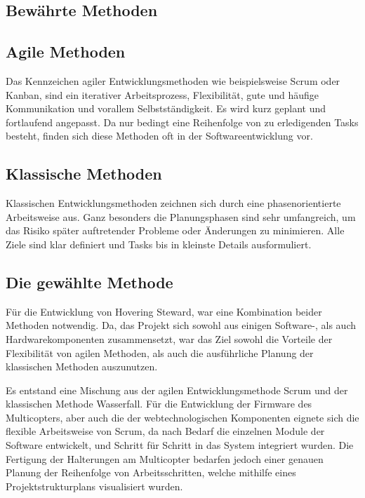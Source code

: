   \subsection{Bewährte Methoden}
    \subsection*{Agile Methoden}
    Das Kennzeichen agiler Entwicklungsmethoden wie beispielsweise Scrum oder Kanban, sind
    ein iterativer Arbeitsprozess, Flexibilität, gute und häufige Kommunikation und vorallem
    Selbstständigkeit. Es wird kurz geplant und fortlaufend angepasst. Da nur bedingt eine Reihenfolge
    von zu erledigenden Tasks besteht, finden sich diese Methoden oft in der Softwareentwicklung vor.

    \subsection*{Klassische Methoden}
    Klassischen Entwicklungsmethoden zeichnen sich durch eine phasenorientierte Arbeitsweise aus.
    Ganz besonders die Planungsphasen sind sehr umfangreich, um das Risiko später auftretender Probleme oder
    Änderungen zu minimieren. Alle Ziele sind klar definiert und Tasks bis in kleinste Details ausformuliert.

  \subsection{Die gewählte Methode}
  Für die Entwicklung von Hovering Steward, war eine Kombination beider Methoden notwendig. Da,
  das Projekt sich sowohl aus einigen Software-, als auch Hardwarekomponenten zusammensetzt, war das
  Ziel sowohl die Vorteile der Flexibilität von agilen Methoden, als auch die ausführliche Planung der klassischen
  Methoden auszunutzen.

  Es entstand eine Mischung aus der agilen Entwicklungsmethode Scrum und der klassischen Methode Wasserfall.
  Für die Entwicklung der Firmware des Multicopters, aber auch die der webtechnologischen Komponenten eignete
  sich die flexible Arbeitsweise von Scrum, da nach Bedarf die einzelnen Module der Software entwickelt, und Schritt
  für Schritt in das System integriert wurden.
  Die Fertigung der Halterungen am Multicopter bedarfen jedoch einer genauen Planung der Reihenfolge von Arbeitsschritten,
  welche mithilfe eines Projektstrukturplans visualisiert wurden.

